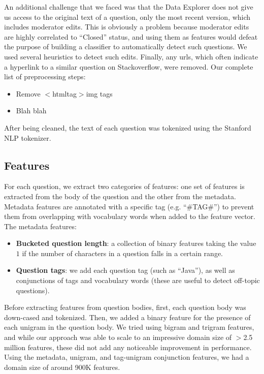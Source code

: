 \documentclass[11pt]{article}
\newcommand{\htmltag}{$\lt${htmltag}$\gt$}
\begin{document}
An additional challenge that we faced was that the Data Explorer does not give us access to the original text of a question, only the most recent version, which includes moderator edits. This is obviously a problem because moderator edits are highly correlated to ``Closed'' status, and using them as features would defeat the purpose of building a classifier to automatically detect such questions. We used several heuristics to detect such edits. Finally, any urls, which often indicate a hyperlink to a similar
question on Stackoverflow, were removed. Our complete list of preprocessing steps:

\begin{itemize}
\item Remove \htmltag{img} tags
\item Blah blah
\end{itemize}

After being cleaned, the text of each question was tokenized using the Stanford NLP tokenizer.

\subsection{Features}

For each question, we extract two categories of features: one set of features is extracted from the body of the question and the other from the metadata. Metadata features are annotated with a specific tag (e.g. ``#TAG#'') to prevent them from overlapping with vocabulary words when added to the feature vector. The metadata features:

\begin{itemize}
  \item \textbf{Bucketed question length}: a collection of binary features
    taking the value $1$ if the number of characters in a question falls in a certain range.
  \item \textbf{Question tags}: we add each question tag (such as ``Java''), as well as conjunctions of tags and vocabulary words (these are useful to detect off-topic questions).
\end{itemize}

Before extracting features from question bodies, first, each question
body was down-cased and tokenized. Then, we added a binary feature for the presence of each unigram in the question body. We tried using bigram and trigram features, and while our approach was able to scale to an impressive domain size of $\gt$2.5 million features, these did not add any noticeable improvement in performance. Using the metadata, unigram, and tag-unigram conjunction features, we had a domain size of around 900K features. 
\end{document}
